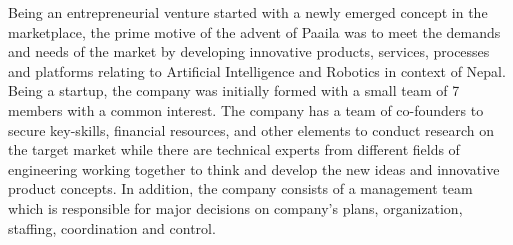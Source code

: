 \documentclass[12pt,a4paper]{scrreprt}
\begin{document}
Being an entrepreneurial venture started with a newly emerged concept in the marketplace, the prime motive of the advent of Paaila was to meet the demands and needs of the market by developing innovative products, services, processes and platforms relating to Artificial Intelligence and Robotics in context of Nepal. Being a startup, the company was initially formed with a small team of 7 members with a common interest. The company has a team of co-founders to secure key-skills, financial
resources, and other elements to conduct research on the target market while there are technical experts from different fields of engineering working together to think and develop the new ideas and innovative product concepts. In addition, the company consists of a management team which is responsible for major decisions on company’s plans, organization, staffing, coordination and control. \\
\end{document}
